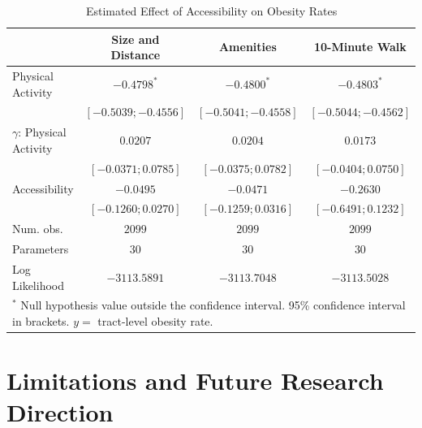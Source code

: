 \documentclass[shortAfour,sageh.bst]{sagej}
\begin{document}
\begin{table}
\caption{Estimated Effect of Accessibility on Obesity Rates}
\label{tab:obesity-models}

\begin{tabular}{l c c c}
\toprule
 & Size and Distance & Amenities & 10-Minute Walk \\
\midrule
Physical Activity           & $-0.4798^{*}$         & $-0.4800^{*}$         & $-0.4803^{*}$         \\
                            & $ [-0.5039; -0.4556]$ & $ [-0.5041; -0.4558]$ & $ [-0.5044; -0.4562]$ \\
$\gamma$: Physical Activity & $0.0207$              & $0.0204$              & $0.0173$              \\
                            & $ [-0.0371;  0.0785]$ & $ [-0.0375;  0.0782]$ & $ [-0.0404;  0.0750]$ \\
Accessibility               & $-0.0495$             & $-0.0471$             & $-0.2630$             \\
                            & $ [-0.1260;  0.0270]$ & $ [-0.1259;  0.0316]$ & $ [-0.6491;  0.1232]$ \\
\midrule
Num. obs.                   & $2099$                & $2099$                & $2099$                \\
Parameters                  & $30$                  & $30$                  & $30$                  \\
Log Likelihood              & $-3113.5891$          & $-3113.7048$          & $-3113.5028$          \\
\bottomrule
\multicolumn{4}{l}{\scriptsize{$^*$ Null hypothesis value outside the confidence interval. 95\% confidence interval in brackets.  $y = $ tract-level obesity rate.}}
\end{tabular}
\end{table}

\hypertarget{limitations-and-future-research-direction}{%
\section{Limitations and Future Research
Direction}\label{limitations-and-future-research-direction}}
\end{document}
